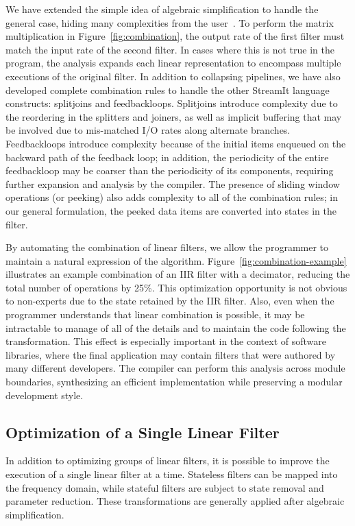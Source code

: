 We have extended the simple idea of algebraic simplification to handle
the general case, hiding many complexities from the
user~\cite{agrawal-cases05}.  To perform the matrix multiplication
in Figure~\ref{fig:combination}, the output rate of the first filter
must match the input rate of the second filter.  In cases where this
is not true in the program, the analysis expands each linear
representation to encompass multiple executions of the original
filter.  In addition to collapsing pipelines, we have also developed
complete combination rules to handle the other StreamIt language
constructs: splitjoins and feedbackloops.  Splitjoins introduce
complexity due to the reordering in the splitters and joiners, as well
as implicit buffering that may be involved due to mis-matched I/O
rates along alternate branches.  Feedbackloops introduce complexity
because of the initial items enqueued on the backward path of the
feedback loop; in addition, the periodicity of the entire feedbackloop
may be coarser than the periodicity of its components, requiring
further expansion and analysis by the compiler.  The presence of
sliding window operations (or peeking) also adds complexity to all of
the combination rules; in our general formulation, the peeked data
items are converted into states in the filter.

By automating the combination of linear filters, we allow the
programmer to maintain a natural expression of the algorithm.
Figure~\ref{fig:combination-example} illustrates an example
combination of an IIR filter with a decimator, reducing the total
number of operations by 25\%.  This optimization opportunity is not
obvious to non-experts due to the state retained by the IIR filter.
Also, even when the programmer understands that linear combination is
possible, it may be intractable to manage of all of the details and to
maintain the code following the transformation.  This effect is
especially important in the context of software libraries, where the
final application may contain filters that were authored by many
different developers.  The compiler can perform this analysis across
module boundaries, synthesizing an efficient implementation while
preserving a modular development style.

\subsection*{Optimization of a Single Linear Filter}

In addition to optimizing groups of linear filters, it is possible to
improve the execution of a single linear filter at a time.  Stateless
filters can be mapped into the frequency domain, while stateful
filters are subject to state removal and parameter reduction.  These
transformations are generally applied after algebraic simplification.

